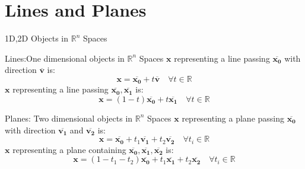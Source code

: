\documentclass[final]{beamer}
\begin{document}
\section{Lines and Planes} %
\label{sec:lines}
\begin{frame}[t]{1D,2D Objects in $\mathbb{R}^n$ Spaces}
	\begin{block}
		{Lines:One dimensional objects in $\mathbb{R}^n$ Spaces}
		$\mathbf{x}$ representing a line passing $\overline{\mathbf{x_0}}$ with direction $\overline{\mathbf{v}}$ is:\[
			\mathbf{x} = \overline{\mathbf{x_0}}+t\overline{\mathbf{v}}\quad \forall t\in\mathbb{R} \tag{Parametric Representation}
		\]
		$\mathbf{x}$ representing a line passing $\overline{\mathbf{x_0}},\overline{\mathbf{x_1}}$ is: \[
			\mathbf{x} = (1-t)\overline{\mathbf{x_0}}+t\overline{\mathbf{x_1}}\quad\forall t\in\mathbb{R} \tag{Parametric Representation}
		\]
	\end{block}
	\begin{block}
		{Planes: Two dimensional objects in $\mathbb{R}^n$ Spaces}
		$\mathbf{x}$ representing a plane  passing $\overline{\mathbf{x_0}}$ with direction $\overline{\mathbf{v_1}}$ and $\overline{\mathbf{v_2}}$ is:\[
			\mathbf{x} = \overline{\mathbf{x_0}}+t_1\overline{\mathbf{v_1}}+t_2\overline{\mathbf{v_2}}\quad \forall t_i\in\mathbb{R} \tag{Parametric Representation}
		\]
		$\mathbf{x}$ representing a plane containing $\overline{\mathbf{x_0}},\overline{\mathbf{x_1}},\overline{\mathbf{x_2}}$ is: \[
			\mathbf{x} = (1-t_1-t_2)\overline{\mathbf{x_0}}+t_1\overline{\mathbf{x_1}}+t_2\overline{\mathbf{x_2}}\quad\forall t_i\in\mathbb{R} \tag{Parametric Representation}
		\]
	\end{block}
\end{frame}
\end{document}
